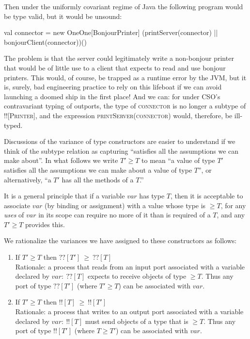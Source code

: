 \documentclass[12pt]{IOS-Book-Article-CPA-2017}
\begin{document}
Then under the uniformly covariant regime of Java the following program would be
type valid, but it would be unsound:
\begin{code}
        val connector = new OneOne[BonjourPrinter]
        (printServer(connector) || bonjourClient(connector))()
\end{code}
The problem is that the server could legitimately write a non-bonjour
printer that would be of little use to a client that expects to read and use
bonjour printers. This would, of course, be trapped as a runtime
error by the JVM, but it is, surely, bad engineering practice
to rely on this lifeboat if we can avoid launching a doomed ship
in the first place!  
% 
And we can: for under CSO's contravariant typing of outports, the
type of \textsc{connector} is no longer a subtype of \textsc{!![Printer]},
and the expression \textsc{printServer(connector)} would, therefore,
be ill-typed.



Discussions of the variance of type constructors are easier to understand
if we think of the subtype relation as capturing ``satisfies all
the assumptions we can make about''. In what follows we write $T'\ge
T$ to mean ``a value of type $T'$ satisfies all the assumptions we
can make about a value of type $T$'', or alternatively, ``a $T'$ has
all the methods of a $T$.''

It is a general principle that if a variable $var$ has type $T$, then
it is acceptable to associate $var$ (by binding or assignment) with a 
value whose type is $\ge T$, for any \textit{uses} of $var$ in
its scope can require no more of it than is required of
a $T$, and any $T'\ge T$ provides this.

We rationalize the variances we have assigned to these constructors
as follows:
\begin{enumerate}
\item If $T'\ge T$ then $??[T']~\ge~??[T]$ 
\\Rationale: a process that reads from an input port associated with a
variable declared by $var:~??[T]$ expects to receive objects of type $\ge
T$. Thus any port of type $??[T']$ (where $T'\ge T$) can be associated
with $var$.


\item If $T'\ge T$ then $!![T]~\ge~!![T']$ 
\\Rationale: a process that writes to an output port associated with
a variable declared by $var:~!![T]$ must send objects of a type 
that is $\ge T$. Thus any port of type $!![T']$ (where $T \ge T'$) 
can be associated with $var$.

\end{enumerate}
\end{document}
